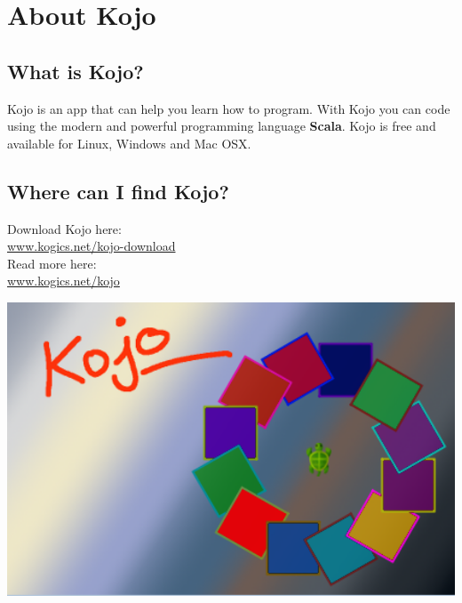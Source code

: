 \chapter{About Kojo}
\begin{multicols}{2}
\section*{\color{black}What is Kojo?}
Kojo is an app that can help you learn how to program. With Kojo you can code using the modern and powerful programming language {\bf\color{blue}Scala}. Kojo is free and available for Linux, Windows and Mac OSX.
\section*{\color{black}Where can I find Kojo?}
Download Kojo here: 
\\

\href{http://www.kogics.net/kojo-download}{www.kogics.net/kojo-download}
\\

Read more here: 
\\

\href{http://www.kogics.net/kojo}{www.kogics.net/kojo}

\columnbreak

\begin{center}
\includegraphics[width=14.0cm]{../img/kojo.png}
\end{center}

\end{multicols}

